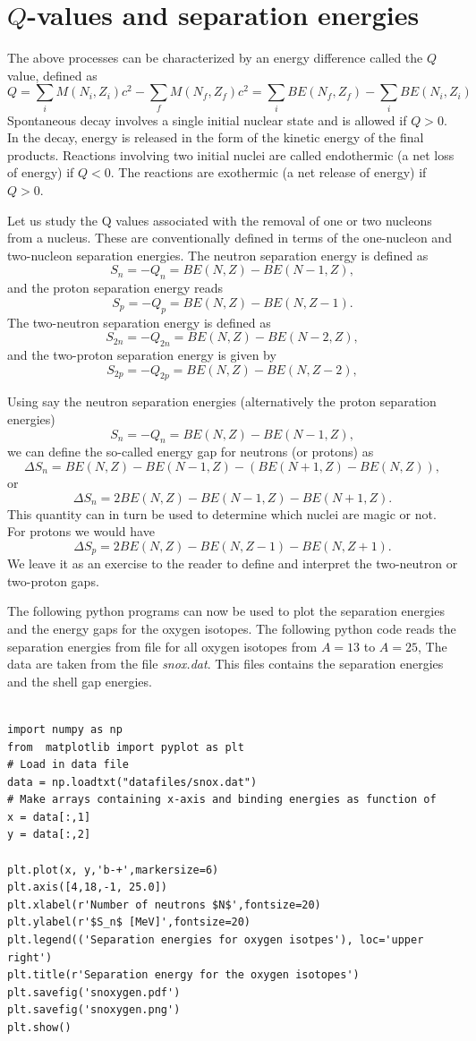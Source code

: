 \documentclass[%
twoside,                 %
final,                   %
10pt]{article}
\begin{document}
\section*{$Q$-values and separation energies}

The above processes can be characterized by an energy difference called the $Q$ value, defined as
\[
Q=\sum_i M(N_i, Z_i)c^2-\sum_f M(N_f, Z_f)c^2=\sum_i BE(N_f, Z_f)-\sum_i BE(N_i, Z_i)
\]
Spontaneous decay involves a single initial nuclear state and is allowed if $Q > 0$. In the decay, energy is released in the form of the kinetic energy of the final products. Reactions involving two initial nuclei are called endothermic (a net loss of energy) if $Q < 0$. The reactions are exothermic (a net release of energy) if $Q > 0$.


Let us study the Q values associated with the removal of one or two nucleons from
a nucleus. These are conventionally defined in terms of the one-nucleon and two-nucleon
separation energies. The neutron separation energy is defined as 
\[
S_n= -Q_n= BE(N,Z)-BE(N-1,Z),
\]
and the proton separation energy reads
\[
S_p= -Q_p= BE(N,Z)-BE(N,Z-1).
\]
The two-neutron separation energy is defined as
\[
S_{2n}= -Q_{2n}= BE(N,Z)-BE(N-2,Z),
\]
and  the two-proton separation energy is given by
\[
S_{2p}= -Q_{2p}= BE(N,Z)-BE(N,Z-2),
\]


Using say the neutron separation energies (alternatively the proton separation energies)
\[
S_n= -Q_n= BE(N,Z)-BE(N-1,Z),
\]
we can define the so-called energy gap for neutrons (or protons) as 
\[
\Delta S_n= BE(N,Z)-BE(N-1,Z)-\left(BE(N+1,Z)-BE(N,Z)\right),
\]
or 
\[
\Delta S_n= 2BE(N,Z)-BE(N-1,Z)-BE(N+1,Z).
\]
This quantity can in turn be used to determine which nuclei are magic or not. 
For protons we would have 
\[
\Delta S_p= 2BE(N,Z)-BE(N,Z-1)-BE(N,Z+1).
\]
We leave it as an exercise to the reader to define and interpret the two-neutron or two-proton gaps. 


The following python programs can now be used to plot the separation energies and the energy gaps for the oxygen isotopes.  The following python code reads the separation energies from file for all oxygen isotopes from $A=13$ to $A=25$, The data are taken from the file \emph{snox.dat}.  This files contains the separation energies and the shell gap energies.
\begin{verbatim}

import numpy as np
from  matplotlib import pyplot as plt
# Load in data file
data = np.loadtxt("datafiles/snox.dat")
# Make arrays containing x-axis and binding energies as function of
x = data[:,1]
y = data[:,2]

plt.plot(x, y,'b-+',markersize=6)
plt.axis([4,18,-1, 25.0])
plt.xlabel(r'Number of neutrons $N$',fontsize=20)
plt.ylabel(r'$S_n$ [MeV]',fontsize=20)
plt.legend(('Separation energies for oxygen isotpes'), loc='upper right')
plt.title(r'Separation energy for the oxygen isotopes')
plt.savefig('snoxygen.pdf')
plt.savefig('snoxygen.png')
plt.show()
\end{verbatim}
\end{document}
